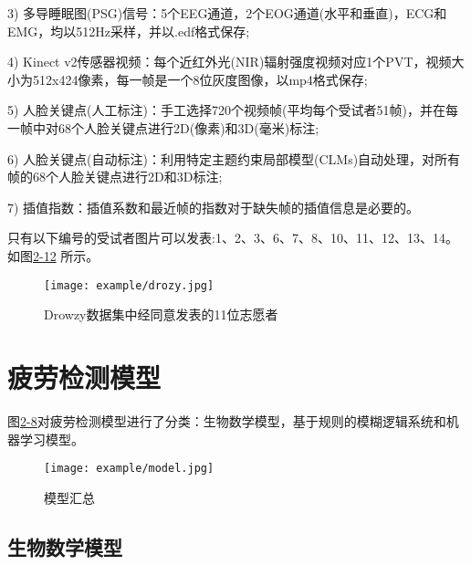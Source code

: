 3) 多导睡眠图(PSG)信号：5个EEG通道，2个EOG通道(水平和垂直)，ECG和EMG，均以512Hz采样，并以.edf格式保存;

4) Kinect v2传感器视频：每个近红外光(NIR)辐射强度视频对应1个PVT，视频大小为512x424像素，每一帧是一个8位灰度图像，以mp4格式保存;

5) 人脸关键点(人工标注)：手工选择720个视频帧(平均每个受试者51帧)，并在每一帧中对68个人脸关键点进行2D(像素)和3D(毫米)标注;

6) 人脸关键点(自动标注)：利用特定主题约束局部模型(CLMs)自动处理，对所有帧的68个人脸关键点进行2D和3D标注;

7) 插值指数：插值系数和最近帧的指数对于缺失帧的插值信息是必要的。

只有以下编号的受试者图片可以发表:1、2、3、6、7、8、10、11、12、13、14。如图\href{figure:2-12}{2-12} 所示。

\begin{figure}[!htp]

\centering
\texttt{[image: example/drozy.jpg]}
\caption{Drowzy数据集中经同意发表的11位志愿者}
\label{figure:2-12}

\end{figure}

\section{疲劳检测模型}

图\href{2-8}{2-8}对疲劳检测模型进行了分类：生物数学模型，基于规则的模糊逻辑系统和机器学习模型。

\begin{figure}[!htp]

\centering
\texttt{[image: example/model.jpg]}
\caption{模型汇总}
\label{figure:1-5}

\end{figure}

\subsection{生物数学模型}

